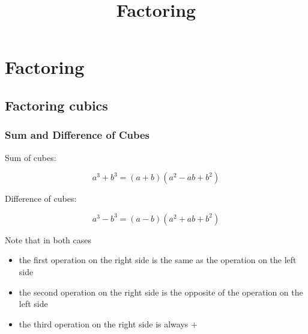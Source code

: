 \documentclass{article}
\title{Factoring}
\begin{document}
\section{Factoring}

\subsection{Factoring cubics}

\subsubsection{Sum and Difference of Cubes}

\begin{theorem}
Sum of cubes:

\[ a^3 + b^3 = (a+b)(a^2 - ab + b^2) \]

Difference of cubes:

\[ a^3 - b^3 = (a-b)(a^2 + ab + b^2) \]
\end{theorem}

\detach

\begin{note}\label{cubes-factoring-mnemonic}
Note that in both cases

\begin{itemize}
\item the first operation on the right side is the same as the operation on the left side
\item the second operation on the right side is the opposite of the operation on the left side
\item the third operation on the right side is always $+$
\end{itemize}
\end{note}
\end{document}
